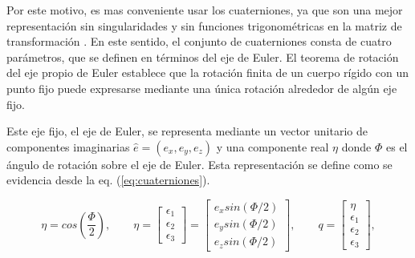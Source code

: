 Por este motivo, es mas conveniente usar los cuaterniones, ya que son una mejor representación sin singularidades y sin funciones trigonométricas en la matriz de transformación \cite{wertz1978spacecraft}. En este sentido, el conjunto de cuaterniones consta de cuatro parámetros, que se definen en términos del eje de Euler. El teorema de rotación del eje propio de Euler establece que la rotación finita de un cuerpo rígido con un punto fijo puede expresarse mediante una única rotación alrededor de algún eje fijo.

Este eje fijo, el eje de Euler, se representa mediante un vector unitario de componentes imaginarias $\hat{e} =(e_x,e_y,e_z)$ y una componente real $\eta$ donde $\Phi$ es el  ángulo de rotación sobre el eje de Euler. Esta representación se define como se evidencia desde la eq. (\ref{eq:cuaterniones}).

\begin{equation}
	\eta = cos\left(\frac{\Phi}{2}\right),
	\qquad
	\eta =\left[\begin{array}{c}
		\epsilon_1\\
		\epsilon_2\\
		 \epsilon_3
	\end{array}\right] =
	\left[\begin{array}{c}
		e_x sin\left(\Phi/2\right)\\
		e_y sin\left(\Phi/2\right)\\
		e_z sin\left(\Phi/2\right)
	\end{array}\right] ,
	\qquad
		q = \left[\begin{array}{c}
			\eta\\
		\epsilon_1\\
		\epsilon_2\\
		\epsilon_3
	\end{array}\right] ,
	\label{eq:cuaterniones}
\end{equation}


